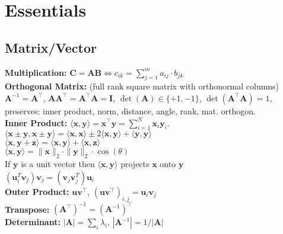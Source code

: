 \section*{Essentials}
\subsection*{Matrix/Vector}
\textbf{Multiplication:} $\mathbf{C}=\mathbf{AB} \Leftrightarrow c_{ik} = \sum_{j=1}^m a_{ij}\cdot b_{jk}$ \\
\textbf{Orthogonal Matrix:} (full rank square matrix with orthonormal columns) $\mathbf{A}^{-1} = \mathbf{A}^\top$, $\mathbf{A} \mathbf{A}^\top = \mathbf{A}^\top \mathbf{A} = \mathbf{I}$, $\operatorname{det}(\mathbf{A}) \in \{+1, -1\}$, $\operatorname{det}(\mathbf{A}^\top \mathbf{A}) = 1$,
	preserves: inner product, norm, distance, angle, rank, mat. orthogon. \\
\textbf{Inner Product:} $\langle \mathbf{x}, \mathbf{y} \rangle = \mathbf{x}^\top \mathbf{y} = \sum_{i=1}^{N} \mathbf{x}_i \mathbf{y}_i$. \\
$\langle \mathbf{x} \pm \mathbf{y}, \mathbf{x} \pm \mathbf{y} \rangle = \langle \mathbf{x}, \mathbf{x} \rangle \pm 2 \langle \mathbf{x}, \mathbf{y} \rangle + \langle \mathbf{y}, \mathbf{y} \rangle$ \\
$\langle \mathbf{x}, \mathbf{y} + \mathbf{z} \rangle = \langle \mathbf{x}, \mathbf{y} \rangle + \langle \mathbf{x}, \mathbf{z} \rangle$\\
$\langle \mathbf{x}, \mathbf{y} \rangle = \|\mathbf{x}\|_2 \cdot \|\mathbf{y}\|_2 \cdot \cos(\theta)$\\
If $\mathbf{y}$ is a unit vector then $\langle \mathbf{x}, \mathbf{y} \rangle$ projects $\mathbf{x}$ onto $\mathbf{y}$ \\
$(\mathbf{u}_i^T\mathbf{v}_j)\mathbf{v}_j = (\mathbf{v}_j\mathbf{v}_j^T)\mathbf{u}_i$ \\
\textbf{Outer Product:} $\mathbf{u} \mathbf{v}^\top$, \quad $(\mathbf{u} \mathbf{v}^\top)_{i, j} = \mathbf{u}_i \mathbf{v}_j$ \\
\textbf{Transpose:} $(\mathbf{A}^\top)^{-1} = (\mathbf{A}^{-1})^\top$ \\
\textbf{Determinant:} $|\mathbf{A}|=\sum_i \lambda_i$, \quad $|\mathbf{A}^{-1}| = 1/|\mathbf{A}|$

